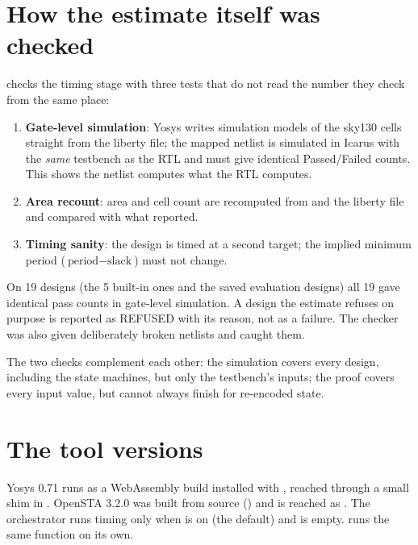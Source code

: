 \section{How the estimate itself was checked}

 checks the timing stage with three tests that do not read the number they check from the same place:
\begin{enumerate}
  \item \textbf{Gate-level simulation}: Yosys writes simulation models of the sky130 cells straight from the liberty file; the mapped netlist is simulated in Icarus with the \emph{same} testbench as the RTL and must give identical Passed/Failed counts. This shows the netlist computes what the RTL computes.
  \item \textbf{Area recount}: area and cell count are recomputed from  and the liberty file and compared with what  reported.
  \item \textbf{Timing sanity}: the design is timed at a second target; the implied minimum period ($\text{period} - \text{slack}$) must not change.
\end{enumerate}
On 19 designs (the 5 built-in ones and the saved evaluation designs) all 19 gave identical pass counts in gate-level simulation. A design the estimate refuses on purpose is reported as REFUSED with its reason, not as a failure. The checker was also given deliberately broken netlists and caught them.

The two checks complement each other: the simulation covers every design, including the state machines, but only the testbench's inputs; the proof covers every input value, but cannot always finish for re-encoded state.

\section{The tool versions}

Yosys 0.71 runs as a WebAssembly build installed with , reached through a small  shim in . OpenSTA 3.2.0 was built from source () and is reached as . The orchestrator runs timing only when  is on (the default) and  is empty.  runs the same function on its own.

